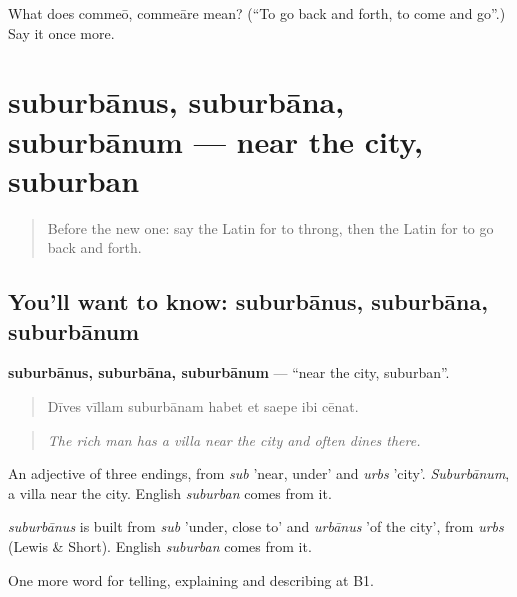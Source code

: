 \begin{tcolorbox}[breakable,colback=teal!4,colframe=teal!35!black,title={Before you move on}]
What does commeō, commeāre mean? (\textquotedblleft{}To go back and forth, to come and go\textquotedblright{}.) Say it once more.
\end{tcolorbox}
\section[suburbānus, suburbāna, suburbānum]{suburbānus, suburbāna, suburbānum — near the city, suburban}

\label{lesson:LA-C460-suburbanus}



\begin{quote}
Before the new one: say the Latin for to throng, then the Latin for to go back and forth.
\end{quote}

\subsection*{You'll want to know: suburbānus, suburbāna, suburbānum}
\textbf{suburbānus, suburbāna, suburbānum} — \textquotedblleft{}near the city, suburban\textquotedblright{}.

\begin{quote}
Dīves vīllam suburbānam habet et saepe ibi cēnat.
\end{quote}

\begin{quote}
\emph{The rich man has a villa near the city and often dines there.}
\end{quote}

An adjective of three endings, from \emph{sub} 'near, under' and \emph{urbs} 'city'. \emph{Suburbānum}, a villa near the city. English \emph{suburban} comes from it.

\begin{cousinweb}
\emph{suburbānus} is built from \emph{sub} 'under, close to' and \emph{urbānus} 'of the city', from \emph{urbs} (Lewis \& Short). English \emph{suburban} comes from it.
\end{cousinweb}

\begin{grammarlens}[title={What you've built}]
One more word for telling, explaining and describing at B1.
\end{grammarlens}

